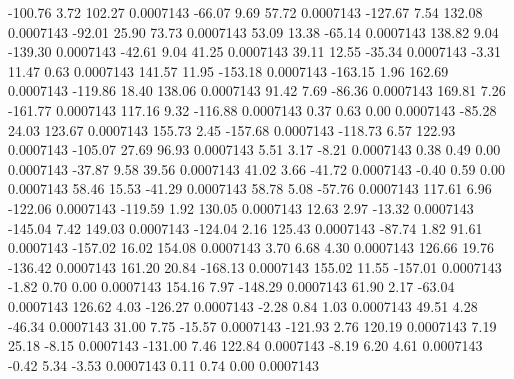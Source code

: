      -100.76        3.72      102.27     0.0007143
      -66.07        9.69       57.72     0.0007143
     -127.67        7.54      132.08     0.0007143
      -92.01       25.90       73.73     0.0007143
       53.09       13.38      -65.14     0.0007143
      138.82        9.04     -139.30     0.0007143
      -42.61        9.04       41.25     0.0007143
       39.11       12.55      -35.34     0.0007143
       -3.31       11.47        0.63     0.0007143
      141.57       11.95     -153.18     0.0007143
     -163.15        1.96      162.69     0.0007143
     -119.86       18.40      138.06     0.0007143
       91.42        7.69      -86.36     0.0007143
      169.81        7.26     -161.77     0.0007143
      117.16        9.32     -116.88     0.0007143
        0.37        0.63        0.00     0.0007143
      -85.28       24.03      123.67     0.0007143
      155.73        2.45     -157.68     0.0007143
     -118.73        6.57      122.93     0.0007143
     -105.07       27.69       96.93     0.0007143
        5.51        3.17       -8.21     0.0007143
        0.38        0.49        0.00     0.0007143
      -37.87        9.58       39.56     0.0007143
       41.02        3.66      -41.72     0.0007143
       -0.40        0.59        0.00     0.0007143
       58.46       15.53      -41.29     0.0007143
       58.78        5.08      -57.76     0.0007143
      117.61        6.96     -122.06     0.0007143
     -119.59        1.92      130.05     0.0007143
       12.63        2.97      -13.32     0.0007143
     -145.04        7.42      149.03     0.0007143
     -124.04        2.16      125.43     0.0007143
      -87.74        1.82       91.61     0.0007143
     -157.02       16.02      154.08     0.0007143
        3.70        6.68        4.30     0.0007143
      126.66       19.76     -136.42     0.0007143
      161.20       20.84     -168.13     0.0007143
      155.02       11.55     -157.01     0.0007143
       -1.82        0.70        0.00     0.0007143
      154.16        7.97     -148.29     0.0007143
       61.90        2.17      -63.04     0.0007143
      126.62        4.03     -126.27     0.0007143
       -2.28        0.84        1.03     0.0007143
       49.51        4.28      -46.34     0.0007143
       31.00        7.75      -15.57     0.0007143
     -121.93        2.76      120.19     0.0007143
        7.19       25.18       -8.15     0.0007143
     -131.00        7.46      122.84     0.0007143
       -8.19        6.20        4.61     0.0007143
       -0.42        5.34       -3.53     0.0007143
        0.11        0.74        0.00     0.0007143
